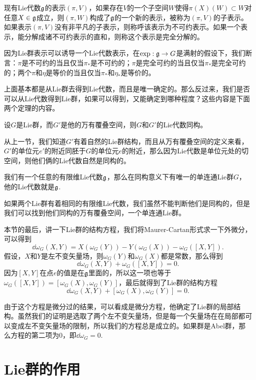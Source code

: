 \para 现有Lie代数${\mathfrak{g}}$的表示$(\pi,V)$，如果存在$V$的一个子空间$W$使得$\pi(X)(W)\subset W$对任意$X\in {\mathfrak{g}}$成立，则$(\pi,W)$构成了${\mathfrak{g}}$的一个新的表示，被称为$(\pi,V)$的子表示。如果表示$(\pi,V)$没有非平凡的子表示，则称呼该表示为不可约表示。如果一个表示，能分解成诸不可约表示的直和，则称这个表示是完全分解的。

\begin{pro}
因为Lie群表示可以诱导一个Lie代数表示，在$\exp:{\mathfrak{g}}\to G$是满射的假设下，我们断言：$\pi$是不可约的当且仅当$\pi_*$是不可约的；$\pi$是完全可约的当且仅当$\pi_*$是完全可约的；两个$\pi$和$\eta$是等价的当且仅当$\pi_*$和$\eta_*$是等价的。
\end{pro}

上面基本都是从Lie群去得到Lie代数，而且是唯一确定的。那么反过来，我们是否可以从Lie代数得到Lie群，如果可以得到，又能确定到哪种程度？这些内容是下面两个定理的内容。

\para 设$G$是Lie群，而$G'$是他的万有覆叠空间，则$G$和$G'$的Lie代数同构。

从上一节，我们知道$G'$有着自然的Lie群结构，而且从万有覆叠空间的定义来看，$G'$的单位元$e'$的附近同胚于$G$的单位元$e$的附近，那么因为Lie代数是单位元处的切空间，则他们俩的Lie代数自然是同构的。

\begin{pro}
我们有一个任意的有限维Lie代数${\mathfrak{g}}$，那么在同构意义下有唯一的单连通Lie群$G$，他的Lie代数就是${\mathfrak{g}}$.
\end{pro}

如果两个Lie群有着相同的有限维Lie代数，我们虽然不能判断他们是同构的，但是我们可以找到他们同构的万有覆叠空间，一个单连通Lie群。

\para 本节的最后，讲一下Lie群的结构方程，我们将Maurer-Cartan形式求一下外微分，可以得到
\[
\dd \omega_G(X,Y)=X(\omega_G(Y))-Y(\omega_G(X))-\omega_G([X,Y]).
\]
假设，$X$和$Y$是左不变矢量场，则$\omega_G(Y)$和$\omega_G(X)$都是常数，那么得到
\[
\dd \omega_G(X,Y)+\omega_G([X,Y])=0.
\]
因为$[X,Y]$在点$e$的值是在${\mathfrak{g}}$里面的，所以这一项也等于$\omega_G([X,Y])=[\omega_G(X),\omega_G(Y)]$，最后就得到了Lie群的结构方程
\[
\dd \omega_G(X,Y)+[\omega_G(X),\omega_G(Y)]=0.
\]

由于这个方程是微分过的结果，可以看成是微分方程，他确定了Lie群的局部结构。虽然我们的证明是选取了两个左不变矢量场，但是每一个矢量场在在局部都可以变成左不变矢量场的限制，所以我们的方程总是成立的。如果群是Abel群，那么方程的第二项为0，即$\dd \omega_G=0$.

\section{Lie群的作用}

